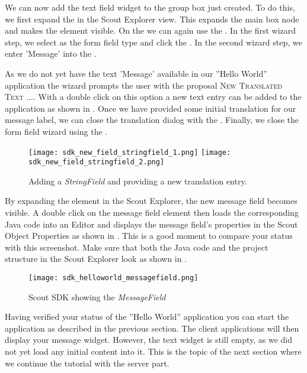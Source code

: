 We can now add the text field widget to the group box just created.
To do this, we first expand the  in the Scout Explorer view. 
This expands the main box node and makes the  element visible.
On the  we can again use the .
In the first wizard step, we select  as the form field type and click the .
In the second wizard step, we enter 'Message' into the .

As we do not yet have the text 'Message' available in our ''Hello World'' application the wizard prompts the user with the proposal \textsc{New Translated Text ...}.
With a double click on this option a new text entry can be added to the application as shown in .
Once we have provided some initial translation for our message label, we can close the translation dialog with the .
Finally, we close the form field wizard using the .

\begin{figure}
\texttt{[image: sdk\_new\_field\_stringfield\_1.png]} \hspace{8mm}
\texttt{[image: sdk\_new\_field\_stringfield\_2.png]}
\caption{Adding a \textit{StringField} and providing a new translation entry.}
\end{figure}

By expanding the  element in the Scout Explorer, the new message field becomes visible. 
A double click on the message field element then loads the corresponding Java code into an Editor and displays the message field's properties in the Scout Object Properties as shown in .
This is a good moment to compare your status with this screenshot.
Make sure that both the Java code and the project structure in the Scout Explorer look as shown in . 

\begin{figure}
\texttt{[image: sdk\_helloworld\_messagefield.png]}
\caption{Scout SDK showing the \it{MessageField}}
\end{figure}

Having verified your status of the ''Hello World'' application you can start the application as described in the previous section.
The client applications will then display your message widget.
However, the text widget is still empty, as we did not yet load any initial content into it.
This is the topic of the next section where we continue the tutorial with the server part.


